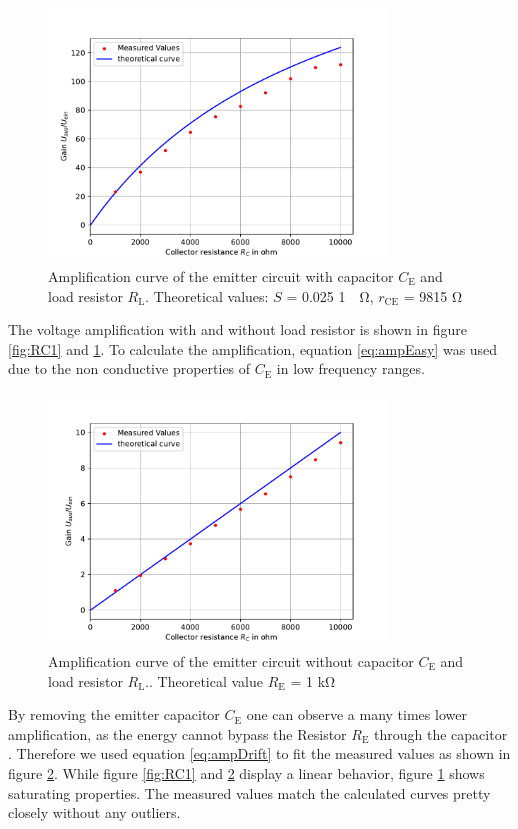 \documentclass[11pt, a4paper]{article}
\begin{document}
\begin{figure}[h]
    \centering
    \includegraphics[width=0.8\textwidth]{plots/RC3.pdf}
    \caption{Amplification curve of the emitter circuit with capacitor $C_{\text{E}}$ and load resistor $R_{\text{L}}$. Theoretical values: $S$ = 0.025 \si{1 \per \ohm}, $r_{\text{CE}}$ = 9815 \si{\ohm}}
    \label{fig:RC3}
\end{figure}
The voltage amplification with and without load resistor is shown in figure \ref{fig:RC1} and \ref{fig:RC3}. To calculate the amplification, equation \ref{eq:ampEasy} was used due to the non conductive properties of $C_{\text{E}}$ in low frequency ranges.
\begin{figure}[h]
    \centering
    \includegraphics[width=0.8\textwidth]{plots/RC2.pdf}
    \caption{Amplification curve of the emitter circuit without capacitor $C_{\text{E}}$ and load resistor $R_{\text{L}}.$. Theoretical value $R_{\text{E}}$ = 1 \si{\kilo\ohm}}
    \label{fig:RC2}
\end{figure}
By removing the emitter capacitor $C_{\text{E}}$ one can observe a many times lower amplification, as the energy cannot bypass the Resistor $R_{\text{E}}$ through the capacitor . Therefore we used equation \ref{eq:ampDrift} to fit the measured values as shown in figure \ref{fig:RC2}.
While figure \ref{fig:RC1} and \ref{fig:RC2} display a linear behavior, figure \ref{fig:RC3} shows saturating properties.
The measured values match the calculated curves pretty closely without any outliers.
\end{document}
